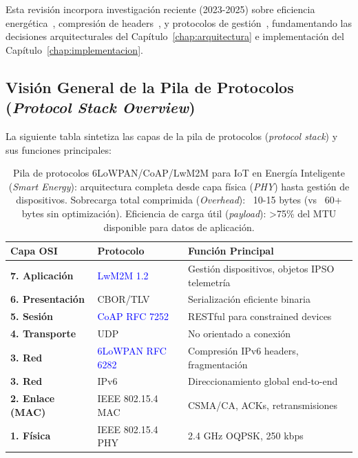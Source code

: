 Esta revisión incorpora investigación reciente (2023-2025) sobre eficiencia energética~\cite{krawiecEnergyFootprintReliability2025}, compresión de headers~\cite{vanderveldenEvaluation6LoWPANGeneric2023}, y protocolos de gestión~\cite{alkwiefiM2MProtocolsOverview2024}, fundamentando las decisiones arquitecturales del Capítulo~\ref{chap:arquitectura} e implementación del Capítulo~\ref{chap:implementacion}.

\subsection{Visión General de la Pila de Protocolos (\textit{Protocol Stack Overview})}

La siguiente tabla sintetiza las capas de la pila de protocolos (\textit{protocol stack}) y sus funciones principales:

\begin{table}[h]
\centering
\small
\caption{Pila de protocolos 6LoWPAN/CoAP/LwM2M para IoT en Energía Inteligente (\textit{Smart Energy}): arquitectura completa desde capa física (\textit{PHY}) hasta gestión de dispositivos. Sobrecarga total comprimida (\textit{Overhead}): ~10-15 bytes (vs ~60+ bytes sin optimización). Eficiencia de carga útil (\textit{payload}): >75\% del MTU disponible para datos de aplicación.}
\label{tab:pila-protocolos}
\begin{tabular}{|p{2.5cm}|p{3.5cm}|p{6.5cm}|}
\hline
\rowcolor{gray!20}
\textbf{Capa OSI} & \textbf{Protocolo} & \textbf{Función Principal} \\
\hline
\textbf{7. Aplicación} & \textcolor{blue}{LwM2M 1.2} & Gestión dispositivos, objetos IPSO telemetría \\
\hline
\textbf{6. Presentación} & CBOR/TLV & Serialización eficiente binaria \\
\hline
\textbf{5. Sesión} & \textcolor{blue}{CoAP RFC 7252} & RESTful para constrained devices \\
\hline
\textbf{4. Transporte} & UDP & No orientado a conexión \\
\hline
\textbf{3. Red} & \textcolor{blue}{6LoWPAN RFC 6282} & Compresión IPv6 headers, fragmentación \\
\hline
\textbf{3. Red} & IPv6 & Direccionamiento global end-to-end \\
\hline
\textbf{2. Enlace (MAC)} & IEEE 802.15.4 MAC & CSMA/CA, ACKs, retransmisiones \\
\hline
\textbf{1. Física} & IEEE 802.15.4 PHY & 2.4 GHz OQPSK, 250 kbps \\
\hline
\end{tabular}
\end{table}


